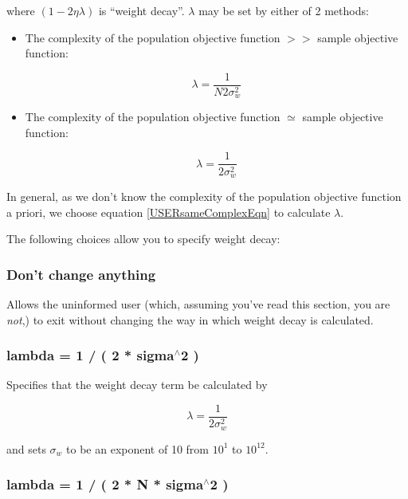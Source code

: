 where $(1-2\eta\lambda)$ is ``weight decay''. $\lambda$ may
be set by either of 2 methods:

\begin{itemize}

\item The complexity of the population objective function $>>$ sample
objective function:

\begin{equation}
\lambda = \frac 1{N2\sigma_w^2}
\end{equation}

\item The complexity of the population objective function $\simeq$
sample objective function:

\begin{equation}\label{USERsameComplexEqn}
\lambda = \frac 1{2\sigma_w^2}
\end{equation}

\end{itemize}

In general, as we don't know the complexity of the population
objective function a priori, we choose equation \ref{USERsameComplexEqn}
to calculate $\lambda$.

The following choices allow you to specify weight decay:

\subsubsection{Don't change anything}

Allows the uninformed user (which, assuming you've read this section,
you are {\em not},) to exit without changing the way in which weight
decay is calculated.

\subsubsection{lambda = 1 / ( 2 * sigma$^\wedge$2 )}

Specifies that the weight decay term be calculated by

\begin{displaymath}
\lambda = \frac 1{2\sigma_w^2}
\end{displaymath}

and sets $\sigma_w$ to be an exponent of 10 from $10^1$ to $10^{12}$.

\subsubsection{lambda = 1 / ( 2 * N * sigma$^\wedge$2 )}

